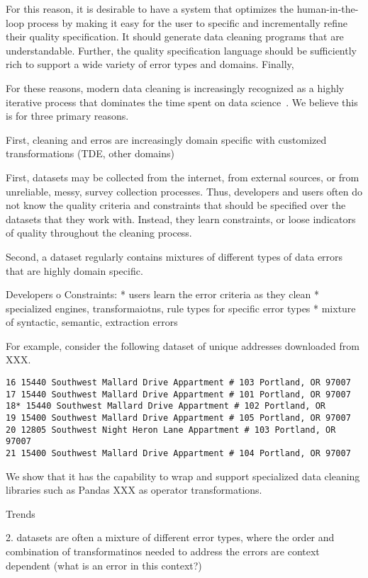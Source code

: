 For this reason, it is desirable to have a system that optimizes the human-in-the-loop process by making it easy for the user to specific and incrementally refine their quality specification.  It should generate data cleaning programs that are understandable.    Further, the quality specification language should be sufficiently rich to support a wide variety of error types and domains.  Finally, 


For these reasons, modern data cleaning is increasingly recognized as a highly iterative process that dominates the time spent on data science~\cite{kandel2012,krishnan2016hilda}.   We believe this is for three primary reasons.  

First, cleaning and erros are increasingly domain specific with customized transformations (TDE, other domains)


First, datasets may be collected from the internet, from external sources, or from unreliable, messy, survey collection processes.  Thus, developers and users often do not know the quality criteria and constraints that should be specified over the datasets that they work with.  Instead, they learn constraints, or loose indicators of quality throughout the cleaning process.  

Second, a dataset regularly contains mixtures of different types of data errors that are highly domain specific.  

Developers o
Constraints:
* users learn the error criteria as they clean
* specialized engines, transformaiotns, rule types for specific error types
* mixture of syntactic, semantic, extraction errors


For example, consider the following dataset of unique addresses downloaded from XXX.   
{\small\begin{verbatim}
16 15440 Southwest Mallard Drive Appartment # 103 Portland, OR 97007
17 15440 Southwest Mallard Drive Appartment # 101 Portland, OR 97007
18* 15440 Southwest Mallard Drive Appartment # 102 Portland, OR
19 15400 Southwest Mallard Drive Appartment # 105 Portland, OR 97007
20 12805 Southwest Night Heron Lane Appartment # 103 Portland, OR 97007
21 15400 Southwest Mallard Drive Appartment # 104 Portland, OR 97007
\end{verbatim}}


We show that it has the capability to wrap and support specialized data cleaning libraries such as Pandas XXX as operator transformations.

Trends


2. datasets are often a mixture of different error types, where the order and combination of transformatinos needed to address the errors are context dependent
(what is an error in this context?)

